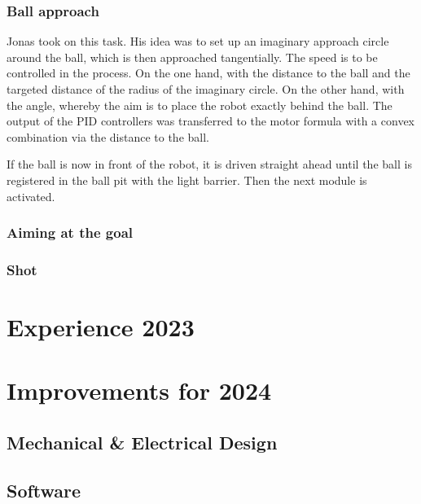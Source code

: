 \documentclass{scrartcl}
\begin{document}
\subsubsection{Ball approach}
Jonas took on this task. His idea was to set up an imaginary approach circle around the ball, which is then approached tangentially. The speed is to be controlled in the process. On the one hand, with the distance to the ball and the targeted distance of the radius of the imaginary circle. On the other hand, with the angle, whereby the aim is to place the robot exactly behind the ball. The output of the PID controllers was transferred to the motor formula with a convex combination via the distance to the ball.

If the ball is now in front of the robot, it is driven straight ahead until the ball is registered in the ball pit with the light barrier. Then the next module is activated.

\subsubsection{Aiming at the goal}

\subsubsection{Shot}

\section{Experience 2023}

\section{Improvements for 2024}

\subsection{Mechanical \& Electrical Design}

\subsection{Software}
\end{document}
